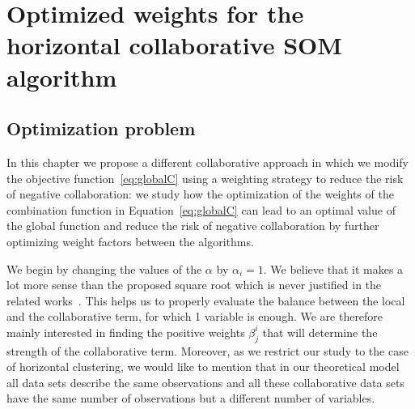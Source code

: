 



\section{Optimized weights for the horizontal collaborative SOM algorithm}
\label{sec:opt-w}

\subsection{Optimization problem}

In this chapter we  propose a different collaborative approach in which we modify the objective function~\eqref{eq:globalC} using a weighting  strategy to reduce the risk of negative collaboration: we study how the optimization of the weights of the combination function in Equation~\eqref{eq:globalC} can lead to an optimal value of the global function and reduce the risk of negative collaboration by further optimizing weight factors between the algorithms.

We begin by changing the values of the $\alpha$ by $\alpha_i=1$. We believe that it makes a lot more sense than the proposed square root which is never justified in the related works~\cite{grozavu2010topological,grozavu2011learning}. This helps us to properly evaluate the balance between the local and the collaborative term, for which 1 variable is enough.
We are therefore mainly interested in finding the positive weights $\beta_j^i$ that will determine the strength of the collaborative term. 
Moreover, as we restrict our study to the case of horizontal clustering, we would like to mention that in our theoretical model all data sets describe the same observations and all these collaborative data sets have the same number of observations but a different number of variables.  


